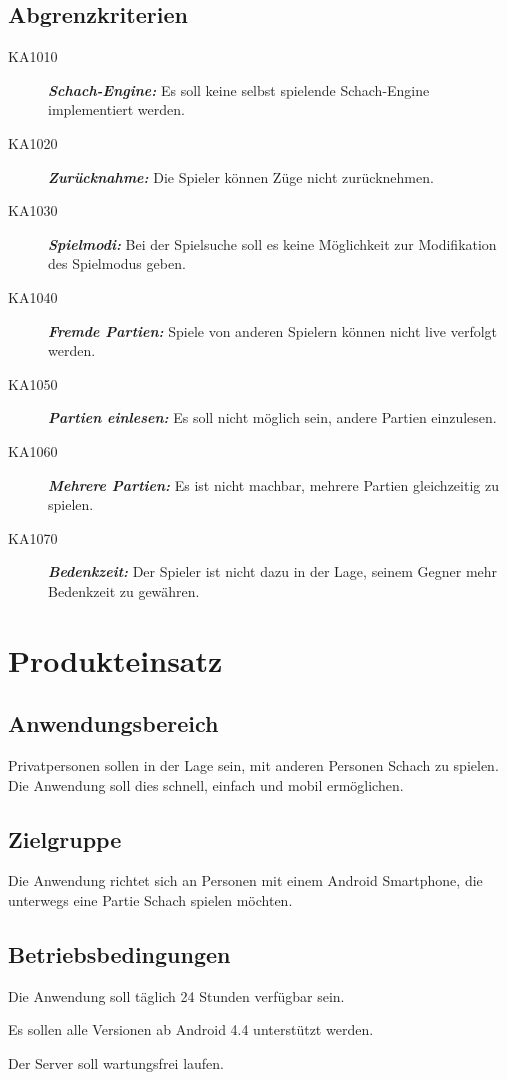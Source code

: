 \documentclass[parskip=full]{scrartcl}
\begin{document}
	\subsection{Abgrenzkriterien}
	\begin{description}
		\item[KA1010] \textbf{\textit{\gls{Schach-Engine}:}} Es soll keine selbst spielende \gls{Schach-Engine} implementiert werden.
		\item[KA1020] \textbf{\textit{Zurücknahme:}} Die Spieler können Züge nicht zurücknehmen.
		\item[KA1030] \textbf{\textit{Spielmodi:}} Bei der Spielsuche soll es keine Möglichkeit zur Modifikation des Spielmodus geben.
		\item[KA1040] \textbf{\textit{Fremde Partien:}} Spiele von anderen \gls{Spieler}n können nicht live verfolgt werden.
		\item[KA1050] \textbf{\textit{Partien einlesen:}} Es soll nicht möglich sein, andere Partien einzulesen.
		\item[KA1060] \textbf{\textit{Mehrere Partien:}} Es ist nicht machbar, mehrere Partien gleichzeitig zu spielen.
		\item[KA1070] \textbf{\textit{\gls{Bedenkzeit}:}} Der Spieler ist nicht dazu in der Lage, seinem Gegner mehr \gls{Bedenkzeit} zu gewähren.
	\end{description}
	\newpage
	\section{Produkteinsatz}
	\subsection{Anwendungsbereich}
	
	Privatpersonen sollen in der Lage sein, mit anderen Personen \gls{Schach} zu spielen. Die Anwendung soll dies schnell, einfach und mobil ermöglichen.	
	
	\subsection{Zielgruppe}
	
	Die Anwendung richtet sich an Personen mit einem Android \gls{Smartphone}, die unterwegs eine Partie \gls{Schach} spielen möchten.
	
	\subsection{Betriebsbedingungen}
	\begin{description}
		\item Die Anwendung soll täglich 24 Stunden verfügbar sein.
		\item Es sollen alle Versionen ab Android 4.4 unterstützt werden.
		\item Der Server soll wartungsfrei laufen.	
	\end{description}
	\newpage
\end{document}
